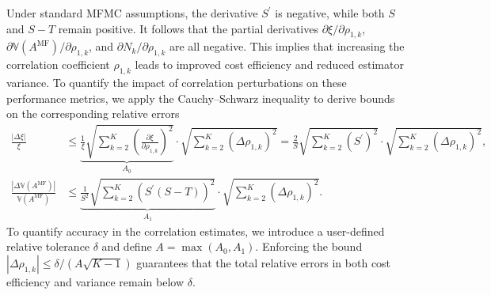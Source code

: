 %
Under standard MFMC assumptions, the derivative $S^\prime$ is negative, while both $S$ and $S - T$ remain positive. It follows that the partial derivatives $\partial \xi / \partial \rho_{1,k}$, $\partial \mathbb{V}(A^{\text{MF}}) / \partial \rho_{1,k}$, and $\partial N_k / \partial \rho_{1,k}$ are all negative. This implies that increasing the correlation coefficient $\rho_{1,k}$ leads to improved cost efficiency and reduced estimator variance. To quantify the impact of correlation perturbations on these performance metrics, we apply the Cauchy–Schwarz inequality to derive bounds on the corresponding relative errors
%
\begin{align}
\label{eq:delta_xi_bound}
    \frac{\left|\Delta \xi\right|}{\xi}&\le \underbrace{\frac{1}{\xi}\sqrt{\sum_{k=2}^K \left(\frac{\partial \xi}{\partial \rho_{1,k}}\right)^2}}_{A_0} \cdot \sqrt{\sum_{k=2}^K\left(\Delta\rho_{1,k}\right)^2}=\frac{2}{S}\sqrt{\sum_{k=2}^K(S^\prime)^2} \cdot \sqrt{\sum_{k=2}^K\left(\Delta\rho_{1,k}\right)^2},\\
    \label{eq:delta_var_bound}
    \frac{\left|\Delta \mathbb{V}\left(A^{\text{MF}}\right)\right|}{\mathbb{V}\left(A^{\text{MF}}\right)}&\le
    \underbrace{\frac{1}{S^2}\sqrt{\sum_{k=2}^K\left(S^\prime \left(S-T\right)\right)^2}}_{A_1}\cdot \sqrt{\sum_{k=2}^K\left(\Delta\rho_{1,k}\right)^2}.
\end{align}
%
To quantify accuracy in the correlation estimates, we introduce a user-defined relative tolerance $\delta$ and define $A = \max(A_0, A_1)$. Enforcing the bound $|\Delta \rho_{1,k}| \le \delta / (A \sqrt{K - 1})$ guarantees that the total relative errors in both cost efficiency and variance remain below $\delta$. 






